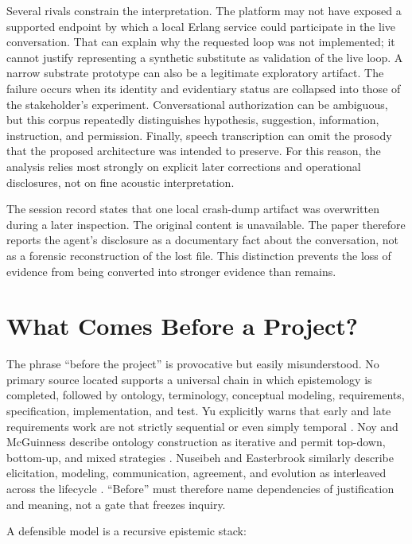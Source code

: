 \documentclass[10pt,a4paper]{article}
\begin{document}
Several rivals constrain the interpretation. The platform may not have exposed a supported endpoint by which a local Erlang service could participate in the live conversation. That can explain why the requested loop was not implemented; it cannot justify representing a synthetic substitute as validation of the live loop. A narrow substrate prototype can also be a legitimate exploratory artifact. The failure occurs when its identity and evidentiary status are collapsed into those of the stakeholder's experiment. Conversational authorization can be ambiguous, but this corpus repeatedly distinguishes hypothesis, suggestion, information, instruction, and permission. Finally, speech transcription can omit the prosody that the proposed architecture was intended to preserve. For this reason, the analysis relies most strongly on explicit later corrections and operational disclosures, not on fine acoustic interpretation.

The session record states that one local crash-dump artifact was overwritten during a later inspection. The original content is unavailable. The paper therefore reports the agent's disclosure as a documentary fact about the conversation, not as a forensic reconstruction of the lost file. This distinction prevents the loss of evidence from being converted into stronger evidence than remains.

\section{What Comes Before a Project?}

The phrase ``before the project'' is provocative but easily misunderstood. No primary source located supports a universal chain in which epistemology is completed, followed by ontology, terminology, conceptual modeling, requirements, specification, implementation, and test. Yu explicitly warns that early and late requirements work are not strictly sequential or even simply temporal \cite{yu1997}. Noy and McGuinness describe ontology construction as iterative and permit top-down, bottom-up, and mixed strategies \cite{noy2001}. Nuseibeh and Easterbrook similarly describe elicitation, modeling, communication, agreement, and evolution as interleaved across the lifecycle \cite{nuseibeh2000}. ``Before'' must therefore name dependencies of justification and meaning, not a gate that freezes inquiry.

A defensible model is a recursive epistemic stack:
\end{document}
